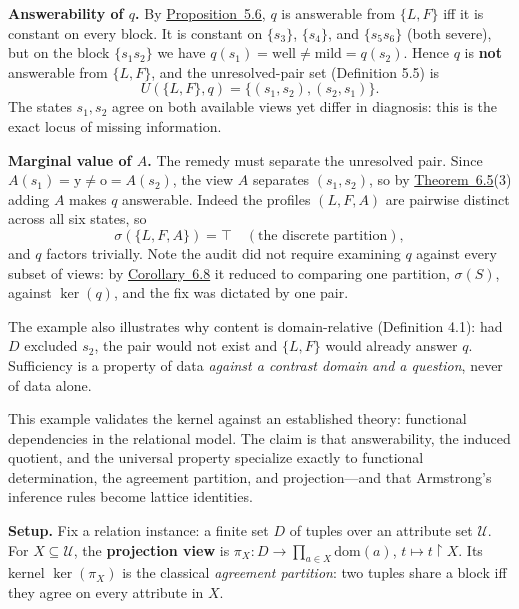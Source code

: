 \textbf{Answerability of \(q\).} By \hyperlink{stmt:5.6}{Proposition~5.6}, \(q\) is answerable from \(\{L,F\}\) iff it is constant on every block. It is constant on \(\{s_3\}\), \(\{s_4\}\), and \(\{s_5s_6\}\) (both severe), but on the block \(\{s_1s_2\}\) we have \(q(s_1)=\text{well}\ne\text{mild}=q(s_2)\). Hence \(q\) is \textbf{not} answerable from \(\{L,F\}\), and the unresolved-pair set (Definition 5.5) is
\[
U(\{L,F\},q)=\{(s_1,s_2),(s_2,s_1)\}.
\]
The states \(s_1,s_2\) agree on both available views yet differ in diagnosis: this is the exact locus of missing information.

\textbf{Marginal value of \(A\).} The remedy must separate the unresolved pair. Since \(A(s_1)=\mathrm{y}\ne\mathrm{o}=A(s_2)\), the view \(A\) separates \((s_1,s_2)\), so by \hyperlink{stmt:6.5}{Theorem~6.5}(3) adding \(A\) makes \(q\) answerable. Indeed the profiles \((L,F,A)\) are pairwise distinct across all six states, so
\[
\sigma(\{L,F,A\})=\top\quad(\text{the discrete partition}),
\]
and \(q\) factors trivially. Note the audit did not require examining \(q\) against every subset of views: by \hyperlink{stmt:6.8}{Corollary~6.8} it reduced to comparing one partition, \(\sigma(S)\), against \(\ker(q)\), and the fix was dictated by one pair.

The example also illustrates why content is domain-relative (Definition 4.1): had \(D\) excluded \(s_2\), the pair would not exist and \(\{L,F\}\) would already answer \(q\). Sufficiency is a property of data \emph{against a contrast domain and a question}, never of data alone.


This example validates the kernel against an established theory: functional dependencies in the relational model. The claim is that answerability, the induced quotient, and the universal property specialize exactly to functional determination, the agreement partition, and projection---\hspace{0pt}and that Armstrong's inference rules become lattice identities.

\textbf{Setup.} Fix a relation instance: a finite set \(D\) of tuples over an attribute set \(\mathcal U\). For \(X\subseteq\mathcal U\), the \textbf{projection view} is \(\pi_X:D\to\prod_{a\in X}\mathrm{dom}(a)\), \(t\mapsto t{\restriction}X\). Its kernel \(\ker(\pi_X)\) is the classical \emph{agreement partition}: two tuples share a block iff they agree on every attribute in \(X\).

